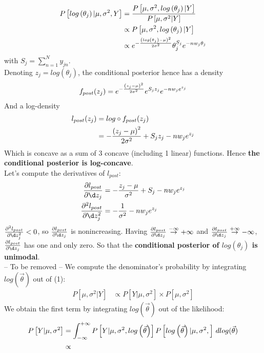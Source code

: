 \documentclass[twoside]{article}
\begin{document}
\begin{align*}
P\left[log\left(\theta_j\right) | \mu, \sigma^2, Y\right] & =  \frac{P\left[\mu, \sigma^2, log\left(\theta_j\right) | Y\right]}{P\left[\mu, \sigma^2 | Y\right]}\\
& \propto P\left[\mu, \sigma^2, log\left(\theta_j\right) | Y\right]\\
& \propto  \* e^{- \frac{\left(log\left(\theta_j\right) - \mu\right)^2}{2 \* \sigma^2}} \* \theta_j^{S_j} \* e^{- n \* w_j \* \theta_j}
\end{align*}
with $S_j = \sum_{n=1}^N y_{jn}$.\\
Denoting $z_j = log(\theta_j)$, the conditional posterior hence has a density
\begin{align*}
f_{post}(z_j) = e^{- \frac{\left(z_j - \mu\right)^2}{2 \* \sigma^2}} \* e^{S_j \* z_j} \* e^{- n \* w_j \* e^{z_j}}
\end{align*}
And a log-density
\begin{align*}
l_{post}(z_j) & = log \circ f_{post}(z_j)\\
&  = - \frac{\left(z_j - \mu\right)^2}{2 \* \sigma^2} + S_j \* z_j - n \* w_j \* e^{z_j}
\end{align*}
Which is concave as a sum of 3 concave (including 1 linear) functions. Hence \textbf{the conditional posterior is log-concave}.\\

Let's compute the derivatives of $l_{post}$:
\begin{align*}
\frac{\partial l_{post}}{\partial \d z_j} & = - \frac{z_j - \mu}{\sigma^2} + S_j - n \* w_j \* e^{z_j}\\
\frac{\partial^2 l_{post}}{\partial \d z_j^2} & = - \frac{1}{\sigma^2} - n \* w_j \* e^{z_j}
\end{align*}
$\frac{\partial^2 l_{post}}{\partial \d z_j^2} <0$, so $\frac{\partial l_{post}}{\partial \d z_j}$ is nonincreasing. Having $\frac{\partial l_{post}}{\partial \d z_j} \overset{-\infty}{\to} +\infty$ and $\frac{\partial l_{post}}{\partial \d z_j} \overset{+\infty}{\to} -\infty$, $\frac{\partial l_{post}}{\partial \d z_j}$ has one and only zero. So that the \textbf{conditional posterior of $log\left(\theta_j\right)$ is unimodal}.\\


-- To be removed --
We compute the denominator's probability by integrating $log\left(\vec{\theta}\right)$ out of (1):
\begin{align*}
P\left[\mu, \sigma^2 | Y \right] & \propto P\left[Y | \mu, \sigma^2 \right] \times P\left[\mu, \sigma^2\right]
\end{align*}
We obtain the first term by integrating $log\left(\vec{\theta}\right)$ out of the likelihood:
\begin{align*}
 P\left[Y | \mu, \sigma^2 \right] & = \int_{-\infty}^{+\infty} P\left[Y | \mu, \sigma^2, log\left(\vec{\theta}\right)\right] \* P\left[log\left(\vec{\theta}\right) | \mu, \sigma^2, \right]\,dlog(\vec{\theta})\\
 & \propto 
\end{align*}
\end{document}
